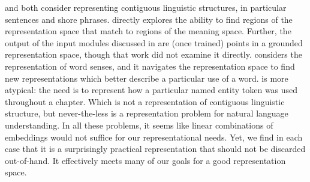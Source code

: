 \documentclass{book}
\begin{document}
 and  both consider representing contiguous linguistic structures, in particular sentences and shore phrases.
 directly explores the ability to find regions of the representation space that match to regions of the meaning space.
Further, the output of the input modules discussed in  are (once trained) points in a grounded representation space, though that work did not examine it directly.
 considers the representation of word senses, and it navigates the representation space to find new representations which better describe a particular use of a word.
 is more atypical:
the need is to represent how a particular named entity token was used throughout a chapter.
Which is not a representation of contiguous linguistic structure, but never-the-less is a  representation problem for natural language understanding.
In all these problems,
it seems like linear combinations of embeddings would not suffice for our representational needs.
Yet, we find in each case that it is a surprisingly practical representation
that should not be discarded out-of-hand.
It effectively meets many of our goals for a good representation space.
\end{document}
